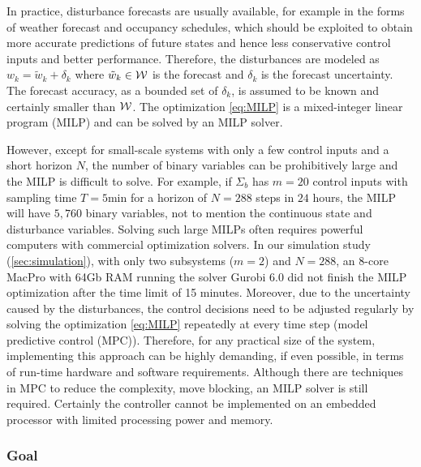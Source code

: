 In practice, disturbance forecasts are usually available, for example in the forms of weather forecast and occupancy schedules, which should be exploited to obtain more accurate predictions of future states and hence less conservative control inputs and better performance.
Therefore, the disturbances are modeled as $w_{k} = \tilde{w}_{k} + \delta_{k}$ where $\tilde{w}_{k} \in \mathcal{W}$ is the forecast and $\delta_{k}$ is the forecast uncertainty.
The forecast accuracy, as a bounded set of $\delta_{k}$, is assumed to be known and certainly smaller than $\mathcal{W}$.
The optimization \eqref{eq:MILP} is a mixed-integer linear program (MILP) and can be solved by an MILP solver.

However, except for small-scale systems with only a few control inputs and a short horizon $N$, the number of binary variables can be prohibitively large and the MILP is difficult to solve.
For example, if $\Sigma_b$ has %
$m=20$ control inputs with sampling time $T = 5 \text{min}$ for a horizon of $N = 288$ steps in $24$ hours, the MILP will have $5 \comma 760$ binary variables, not to mention the continuous state and disturbance variables.
Solving such large MILPs often requires powerful computers with commercial optimization
solvers.
In our simulation study (\cref{sec:simulation}), with only two subsystems ($m=2$) and $N=288$, an 8-core MacPro with 64Gb RAM running the %
solver Gurobi 6.0 did not finish the MILP optimization after the time limit of 15 minutes.
Moreover, due to the uncertainty caused by the disturbances, the control decisions need to be adjusted regularly by solving the optimization \eqref{eq:MILP} repeatedly at every time step (model predictive control (MPC)).
Therefore, for any practical size of the system, implementing this approach can be highly demanding, if even possible, in terms of run-time hardware and software requirements.
Although there are techniques in MPC to reduce the complexity, \eg move blocking, an MILP solver is still required.
Certainly the controller cannot be implemented on an embedded processor with limited processing power and memory.

\subsubsection{Goal}

